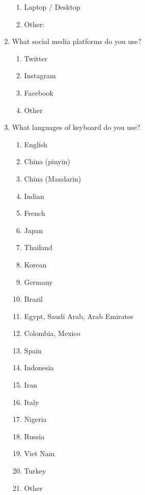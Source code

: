 \documentclass[acmsmall,screen,authorversion,nonacm]{acmart}
\begin{document}
\begin{enumerate}
\begin{enumerate}
                \item Laptop / Desktop
                \item Other:
            \end{enumerate}
        \item What social media platforms do you use? 
            \begin{enumerate}
                \item Twitter
                \item Instagram
                \item Facebook
                \item Other
            \end{enumerate}
        \item What languages of keyboard do you use?
            \begin{enumerate}
                \item English
                \item China (pinyin)
                \item China (Mandarin)
                \item Indian
                \item French
                \item Japan
                \item Thailand
                \item Korean
                \item Germany
                \item Brazil
                \item Egypt, Saudi Arab, Arab Emirates
                \item Colombia, Mexico
                \item Spain
                \item Indonesia
                \item Iran
                \item Italy
                \item Nigeria
                \item Russia
                \item Viet Nam
                \item Turkey
                \item Other
            \end{enumerate}
\end{enumerate}
\end{document}

